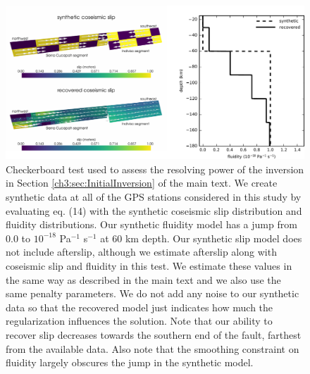 \begin{figure}
\noindent\includegraphics[scale=1.0]{ch3/figures/2016jb013114-pS02}
\caption{Checkerboard test used to assess the resolving power of the
inversion in Section \ref{ch3:sec:InitialInversion} of the main text.  We create synthetic data
at all of the GPS stations considered in this study by evaluating eq.
(14) with the synthetic coseismic slip distribution and fluidity
distributions. Our synthetic fluidity model has a jump from 0.0 to
$10^{-18}$ Pa$^{-1}$ s$^{-1}$ at 60 km depth.  Our synthetic slip
model does not include afterslip, although we estimate afterslip along
with coseismic slip and fluidity in this test.  We estimate these
values in the same way as described in the main text and we also use
the same penalty parameters.  We do not add any noise to our synthetic
data so that the recovered model just indicates how much the
regularization influences the solution.  Note that our ability to
recover slip decreases towards the southern end of the fault, farthest
from the available data.  Also note that the smoothing constraint on
fluidity largely obscures the jump in the synthetic model.}
\label{ch3:fig:S2}
\end{figure}

